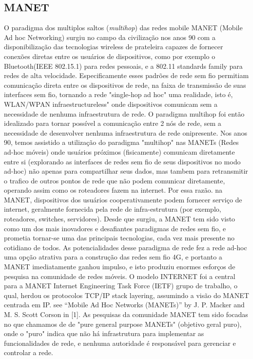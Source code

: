 \documentclass[12pt, %
openright, 
oneside, %
a4paper,    %
brazil]{facom-ufu-abntex2}
\begin{document}
\subsection{MANET}
O paradigma dos multiplos saltos (\emph{multihop}) das redes mobile MANET (Mobile Ad hoc Networking) surgiu no campo da civilização nos anos 90 com a disponibilização das tecnologias wireless de prateleira capazes de fornecer conexões diretas entre os usuários de dispositivos, como por exemplo o Bluetooth(IEEE 802.15.1) para redes pessoais, e a 802.11 standards family para redes de alta velocidade. Especificamente esses padrões de rede sem fio permitiam comunicação direta entre os dispositivos de rede, na faixa de transmissão de suas interfaces sem fio, tornando a rede "single-hop ad hoc" uma realidade, isto é, WLAN/WPAN infraestructureless" onde dispositivos comunicam sem a necessidade de nenhuma infraestrutura de rede.
O paradigma multihop foi então idealizado para tornar possível a comunicação entre 2 nós de rede, sem a necessidade de desenvolver nenhuma  infraestrutura de rede onipresente. Nos anos 90, temos assistido a utilização do paradigma "multihop" nas  MANETs (Redes ad-hoc móveis) onde usuários próximos (fisicamente) comunicam diretamente entre si (explorando as interfaces de redes sem fio de seus dispositivos no modo ad-hoc) não apenas para compartilhar seus dados, mas tambem para retransmitir o trafico de outros pontos de rede que não podem comunicar diretamente, operando assim como os roteadores fazem na internet. Por essa razão. na MANET, dispositivos dos usuários cooperativamente podem fornecer serviço de internet, geralmente fornecida pela rede de infra-estrutura (por exemplo, roteadores, switches, servidores).
Desde que surgiu, a MANET tem sido visto como um dos mais inovadores e desafiantes paradigmas de redes sem fio, e prometia tornar-se uma das principais tecnologias, cada vez mais presente no cotidiano de todos. As potencialidades desse paradigma de rede fez a rede ad-hoc uma opção atrativa para a construção das redes sem fio 4G, e portanto a MANET imediatamente ganhou impulso, e isto produziu enormes esforços de pesquisa na comunidade de redes móveis.
O modelo INTERNET foi a central para a MANET Internet Engineering Task Force (IETF) grupo de trabalho, o qual, herdou os protocolos TCP/IP stack layering, assumindo a visão do MANET centrada em IP. see “Mobile Ad Hoc
Networks (MANETs)” by J. P. Macker and M.
S. Scott Corson in [1].
As pesquisas da comunidade MANET tem sido focadas no que chamamos de de "pure general purpose MANETs" (objetivo geral puro), onde o "puro" indica que não há infrastrutura para implementar as funcionalidades de rede, e nenhuma autoridade é responsável para gerenciar e controlar a rede. 
\end{document}
